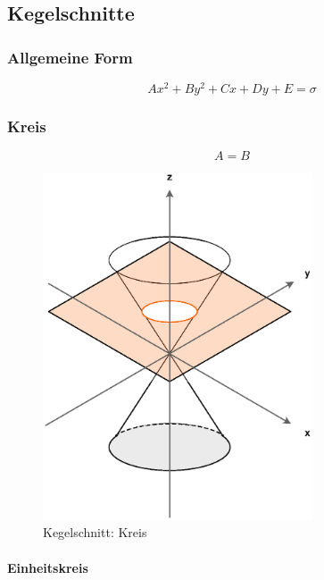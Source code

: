 \subsection{Kegelschnitte}

\subsubsection{Allgemeine Form}

\[
	A x^2 + B y^2 + C x + D y + E = \sigma
\]

\subsubsection{Kreis}

\[
	A = B
\]

\begin{figure}[H]
	\centering
	\includegraphics[width=8cm]{grafiken/kegelschnitte/kreis}
	\caption{Kegelschnitt: Kreis}
\end{figure}

\paragraph{Einheitskreis}

